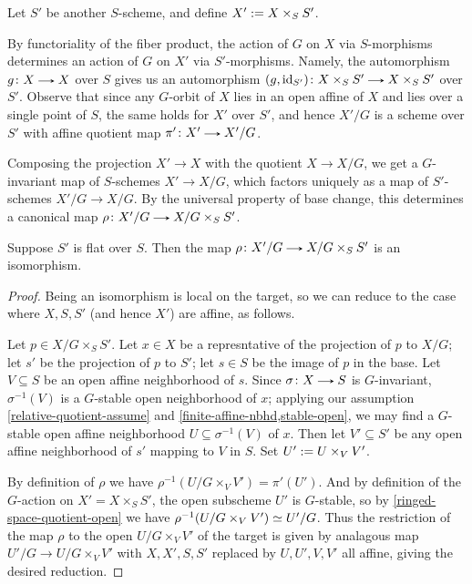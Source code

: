 \begin{nothing}
  \label{quotient-base-change}
  Let $S'$ be another $S$-scheme, and define $X' \mathrel{:=} X \times_S S'$.

  \begin{subconstruction}
    \label{action-base-change}
    By functoriality of the fiber product, the action of $G$ on $X$ via $S$-morphisms determines an action of $G$ on $X'$ via $S'$-morphisms. Namely, the automorphism $g \c X \to X$ over $S$ gives us an automorphism $(g, \id_{S'}) \c X \times_S S' \to X \times_S S'$ over $S'$. Observe that since any $G$-orbit of $X$ lies in an open affine of $X$ and lies over a single point of $S$, the same holds for $X'$ over $S'$, and hence $X'/G$ is a scheme over $S'$ with affine quotient map $\pi' \c X' \to X'/G$.

    Composing the projection $X' \to X$ with the quotient $X \to X/G$, we get a $G$-invariant map of $S$-schemes $X' \to X/G$, which factors uniquely as a map of $S'$-schemes $X'/G \to X/G$. By the universal property of base change, this determines a canonical map $\rho \c X'/G \to X/G \times_S S'$.
  \end{subconstruction}

  \begin{subproposition}
    \label{quotient-flat-base-change}
    Suppose $S'$ is flat over $S$. Then the map $\rho \c X'/G \to X/G \times_S S'$ is an isomorphism.

    \begin{proof}
      Being an isomorphism is local on the target, so we can reduce to the case where $X,S,S'$ (and hence $X'$) are affine, as follows.

      Let $p \in X/G \times_S S'$. Let $x \in X$ be a represntative of the projection of $p$ to $X/G$; let $s'$ be the projection of $p$ to $S'$; let $s \in S$ be the image of $p$ in the base. Let $V \subseteq S$ be an open affine neighborhood of $s$. Since $\sigma \c X \to S$ is $G$-invariant, $\sigma^{-1}(V)$ is a $G$-stable open neighborhood of $x$; applying our assumption \cref{relative-quotient-assume} and \cref{finite-affine-nbhd,stable-open}, we may find a $G$-stable open affine neighborhood $U \subseteq \sigma^{-1}(V)$ of $x$. Then let $V' \subseteq S'$ be any open affine neighborhood of $s'$ mapping to $V$ in $S$.  Set $U' \mathrel{:=} U \times_V V'$.

      By definition of $\rho$ we have $\rho^{-1}(U/G \times_V V') = \pi'(U')$. And by definition of the $G$-action on $X' = X \times_S S'$, the open subscheme $U'$ is $G$-stable, so by \cref{ringed-space-quotient-open} we have $\rho^{-1}(U/G \times_V V') \simeq U'/G$. Thus the restriction of the map $\rho$ to the open $U/G \times_V V'$ of the target is given by analagous map $U'/G \to U/G \times_V V'$ with $X,X',S,S'$ replaced by $U,U',V,V'$ all affine, giving the desired reduction.


\end{proof}
\end{subproposition}
\end{nothing}
